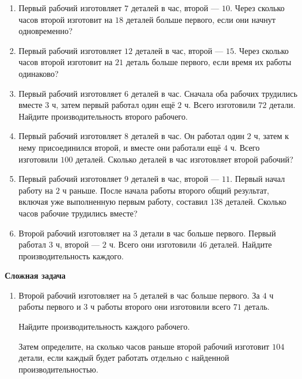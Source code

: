 \documentclass[a4paper,12pt]{article}
\begin{document}
\begin{enumerate}[label=\textbf{\arabic*.},start=4]

  \item
  Первый рабочий изготовляет $7$ деталей в час,
  второй --- $10$.
  Через сколько часов второй изготовит
  на $18$ деталей больше первого,
  если они начнут одновременно?

  \item
  Первый рабочий изготовляет $12$ деталей в час,
  второй --- $15$.
  Через сколько часов второй изготовит
  на $21$ деталь больше первого,
  если время их работы одинаково?

  \item
  Первый рабочий изготовляет $6$ деталей в час.
  Сначала оба рабочих трудились вместе $3$ ч,
  затем первый работал один ещё $2$ ч.
  Всего изготовили $72$ детали.
  Найдите производительность второго рабочего.

  \item
  Первый рабочий изготовляет $8$ деталей в час.
  Он работал один $2$ ч,
  затем к нему присоединился второй,
  и вместе они работали ещё $4$ ч.
  Всего изготовили $100$ деталей.
  Сколько деталей в час изготовляет второй рабочий?

  \item
  Первый рабочий изготовляет $9$ деталей в час,
  второй --- $11$.
  Первый начал работу на $2$ ч раньше.
  После начала работы второго общий результат,
  включая уже выполненную первым работу,
  составил $138$ деталей.
  Сколько часов рабочие трудились вместе?

  \item
  Второй рабочий изготовляет
  на $3$ детали в час больше первого.
  Первый работал $3$ ч,
  второй --- $2$ ч.
  Всего они изготовили $46$ деталей.
  Найдите производительность каждого.

\end{enumerate}

\vspace{0.5em}

\textbf{Сложная задача}

\begin{enumerate}[label=\textbf{\arabic*.},start=10]

  \item
  Второй рабочий изготовляет
  на $5$ деталей в час больше первого.
  За $4$ ч работы первого
  и $3$ ч работы второго
  они изготовили всего $71$ деталь.

  Найдите производительность каждого рабочего.

  Затем определите,
  на сколько часов раньше второй рабочий
  изготовит $104$ детали,
  если каждый будет работать отдельно
  с найденной производительностью.

\end{enumerate}
\end{document}
